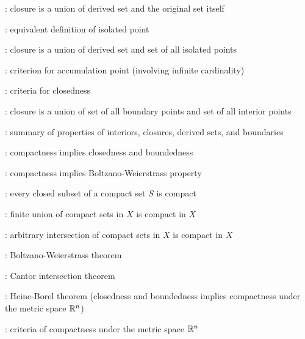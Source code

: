 \item {}: closure is a union of derived set and the original set itself
\item {}: equivalent definition of isolated point
\item {}: closure is a union of derived set and set of all isolated points
\item {}: criterion for accumulation point (involving infinite cardinality)
\item {}: criteria for closedness
\item {}: closure is a union of set of all boundary points and set of all interior points
\item {}: summary of properties of interiors, closures, derived sets, and boundaries
\item {}: compactness implies closedness and boundedness
\item {}: compactness implies Boltzano-Weierstrass property
\item {}: every closed subset of a compact set \(S\) is compact
\item {}: finite union of compact sets in \(X\) is compact in \(X\)
\item {}: arbitrary intersection of compact sets in \(X\) is compact in \(X\)
\item {}: Boltzano-Weierstrass theorem
\item {}: Cantor intersection theorem
\item {}: Heine-Borel theorem (closedness and boundedness
implies compactness under the metric space \(\mathbb{R}^n\))
\item {}: criteria of compactness
under the metric space \(\mathbb{R}^n\)
